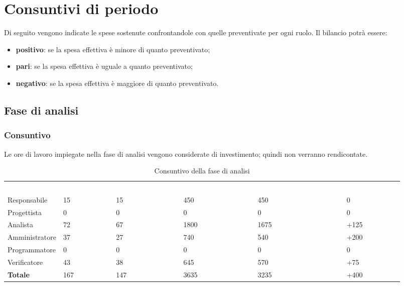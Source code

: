 \section{Consuntivi di periodo}
Di seguito vengono indicate le spese sostenute confrontandole con quelle preventivate per ogni ruolo.  Il bilancio potrà essere:
\begin{itemize}
\item \textbf{positivo}: se la spesa effettiva è minore di quanto preventivato;
\item \textbf{pari}: se la spesa effettiva è uguale a quanto preventivato;
\item \textbf{negativo}: se la spesa effettiva è maggiore di quanto preventivato.
\end{itemize}

\subsection{Fase di analisi}
\subsubsection{Consuntivo}
Le ore di lavoro impiegate nella fase di analisi vengono considerate di investimento; quindi non verranno rendicontate.

\begin{table}[!htbp]
\begin{center}
\renewcommand{\arraystretch}{1.5}
\begin{tabular}{ m{}<{\centering}  m{}<{\centering} m{}<{\centering} m{}<{\centering} m{}<{\centering} m{}<{\centering}}
	\rowcolor{darkblue}
	\textcolor{white}{\textbf{Ruolo}} & \textcolor{white}{\textbf{Ore Effettive}} & \textcolor{white}{\textbf{Ore Preventivate}}&\textcolor{white}{\textbf{Costo Effettivo (\euro) }}&\textcolor{white}{\textbf{Costo Preventivato (\euro)}}&\textcolor{white}{\textbf{Differenza (\euro)}}\\ 

	Responsabile  & 15 & 15 & 450 & 450 & 0\\	
	
	Progettista & 0 & 0 & 0 & 0 & 0\\
	
	Analista & 72 & 67 & 1800 & 1675 & +125\\
	
	Amministratore & 37 & 27 & 740 & 540 & +200\\
	
	Programmatore & 0 & 0 &0 &0 & 0\\
	
	Verificatore & 43 & 38 & 645 & 570 & +75\\
	
	\textbf{Totale} & 167 & 147 & 3635 & 3235 & +400\\
	
\end{tabular}
\caption{Consuntivo della fase di analisi}
\end{center}
\end{table}

